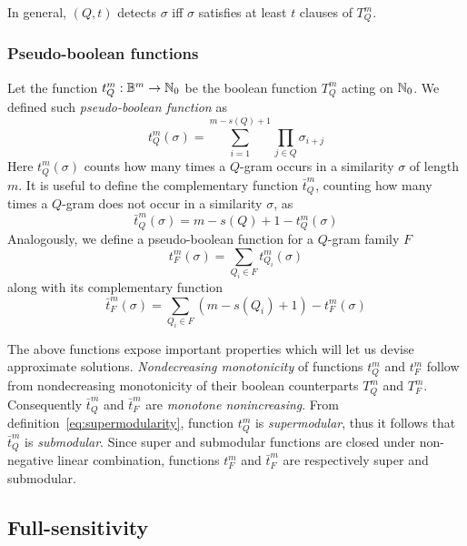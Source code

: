 In general, $(Q,t)$ detects $\sigma$ iff $\sigma$ satisfies at least $t$ clauses of $T_{Q}^{m}$.

\subsubsection{Pseudo-boolean functions}

Let the function $t_{Q}^{m}: \mathbb {B}^m \rightarrow \mathbb {N}_0$ be the boolean function $T_{Q}^{m}$ acting on $\mathbb {N}_0$.
We defined such \emph{pseudo-boolean function} as
\begin{equation}
\label{eq:qgram-pseudo}
t_{Q}^{m}(\sigma) = \sum_{i=1}^{m-s(Q)+1} \prod_{j \in Q}\sigma_{i+j}
\end{equation}
Here $t_{Q}^{m}(\sigma)$ counts how many times a $Q$-gram occurs in a similarity $\sigma$ of length $m$.
It is useful to define the complementary function $\bar{t}_{Q}^{m}$, counting how many times a $Q$-gram does not occur in a similarity $\sigma$, as
\begin{equation}
\label{eq:qgram-pseudoneg}
\bar{t}_{Q}^{m}(\sigma) = m - s(Q) + 1 - t_{Q}^{m}(\sigma)
\end{equation}
Analogously, we define a pseudo-boolean function for a $Q$-gram family $F$
\begin{equation}
\label{eq:family-pseudo}
t_{F}^{m}(\sigma) = \sum_{Q_i \in F} t_{Q_i}^{m}(\sigma)
\end{equation}
along with its complementary function
\begin{equation}
\label{eq:family-pseudoneg}
\bar{t}_{F}^{m}(\sigma) = \sum_{Q_i \in F}{(m - s(Q_i) + 1)} - t_{F}^{m}(\sigma)
\end{equation}

The above functions expose important properties which will let us devise approximate solutions.
\emph{Nondecreasing monotonicity} of functions $t_{Q}^{m}$ and $t_{F}^{m}$ follow from nondecreasing monotonicity of their boolean counterparts $T_{Q}^{m}$ and $T_{F}^{m}$. Consequently $\bar{t}_{Q}^{m}$ and $\bar{t}_{F}^{m}$ are \emph{monotone nonincreasing}.
From definition~\ref{eq:supermodularity}, function $t_{Q}^{m}$ is \emph{supermodular}, thus it follows that $\bar{t}_{Q}^{m}$ is \emph{submodular}.
Since super and submodular functions are closed under non-negative linear combination, functions $t_{F}^{m}$ and $\bar{t}_{F}^{m}$ are respectively super and submodular.

\subsection{Full-sensitivity}

